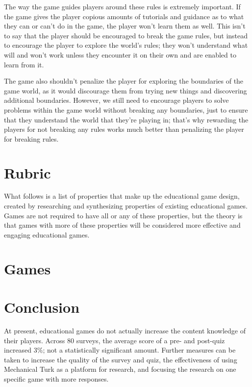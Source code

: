 \documentclass[12pt]{report}
\begin{document}
		The way the game guides players around these rules is extremely important. If the game gives the player copious amounts of tutorials and guidance as to what they can or can't do in the game, the player won't learn them as well. This isn't to say that the player should be encouraged to break the game rules, but instead to encourage the player to explore the world's rules; they won't understand what will and won't work unless they encounter it on their own and are enabled to learn from it.
	
		The game also shouldn't penalize the player for exploring the boundaries of the game world, as it would discourage them from trying new things and discovering additional boundaries. However, we still need to encourage players to solve problems within the game world without breaking any boundaries, just to ensure that they understand the world that they're playing in; that's why rewarding the players for not breaking any rules works much better than penalizing the player for breaking rules.

\section{Rubric}
	What follows is a list of properties that make up the educational game design, created by researching and synthesizing properties of existing educational games. Games are not required to have all or any of these properties, but the theory is that games with more of these properties will be considered more effective and engaging educational games.



\section{Games}






	


\section{Conclusion}
	At present, educational games do not actually increase the content knowledge of their players. Across 80 surveys, the average score of a pre- and post-quiz increased 3\%; not a statistically significant amount. Further measures can be taken to increase the quality of the survey and quiz, the effectiveness of using Mechanical Turk as a platform for research, and focusing the research on one specific game with more responses.
\end{document}

